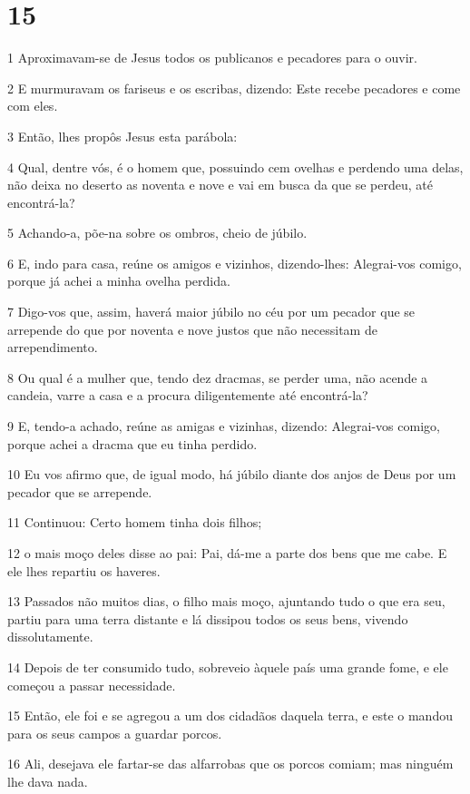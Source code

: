 \chapter{15}

\par 1 Aproximavam-se de Jesus todos os publicanos e pecadores para o ouvir.
\par 2 E murmuravam os fariseus e os escribas, dizendo: Este recebe pecadores e come com eles.
\par 3 Então, lhes propôs Jesus esta parábola:
\par 4 Qual, dentre vós, é o homem que, possuindo cem ovelhas e perdendo uma delas, não deixa no deserto as noventa e nove e vai em busca da que se perdeu, até encontrá-la?
\par 5 Achando-a, põe-na sobre os ombros, cheio de júbilo.
\par 6 E, indo para casa, reúne os amigos e vizinhos, dizendo-lhes: Alegrai-vos comigo, porque já achei a minha ovelha perdida.
\par 7 Digo-vos que, assim, haverá maior júbilo no céu por um pecador que se arrepende do que por noventa e nove justos que não necessitam de arrependimento.
\par 8 Ou qual é a mulher que, tendo dez dracmas, se perder uma, não acende a candeia, varre a casa e a procura diligentemente até encontrá-la?
\par 9 E, tendo-a achado, reúne as amigas e vizinhas, dizendo: Alegrai-vos comigo, porque achei a dracma que eu tinha perdido.
\par 10 Eu vos afirmo que, de igual modo, há júbilo diante dos anjos de Deus por um pecador que se arrepende.
\par 11 Continuou: Certo homem tinha dois filhos;
\par 12 o mais moço deles disse ao pai: Pai, dá-me a parte dos bens que me cabe. E ele lhes repartiu os haveres.
\par 13 Passados não muitos dias, o filho mais moço, ajuntando tudo o que era seu, partiu para uma terra distante e lá dissipou todos os seus bens, vivendo dissolutamente.
\par 14 Depois de ter consumido tudo, sobreveio àquele país uma grande fome, e ele começou a passar necessidade.
\par 15 Então, ele foi e se agregou a um dos cidadãos daquela terra, e este o mandou para os seus campos a guardar porcos.
\par 16 Ali, desejava ele fartar-se das alfarrobas que os porcos comiam; mas ninguém lhe dava nada.
